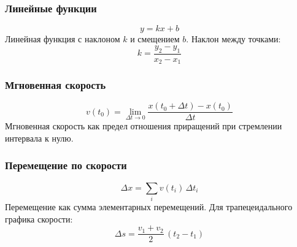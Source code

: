 \documentclass[12pt]{article}
\begin{document}
\subsubsection*{Линейные функции}
\[y = kx + b\]
Линейная функция с наклоном $k$ и смещением $b$. Наклон между точками:
\[k = \frac{y_2 - y_1}{x_2 - x_1}\]

\subsubsection*{Мгновенная скорость}
\[v(t_0) = \lim_{\Delta t \to 0} \frac{x(t_0+\Delta t) - x(t_0)}{\Delta t}\]
Мгновенная скорость как предел отношения приращений при стремлении интервала к нулю.

\subsubsection*{Перемещение по скорости}
\[\Delta x = \sum_i v(t_i)\,\Delta t_i\]
Перемещение как сумма элементарных перемещений. Для трапецеидального графика скорости:
\[\Delta s = \frac{v_1 + v_2}{2}\,(t_2 - t_1)\]
\end{document}

